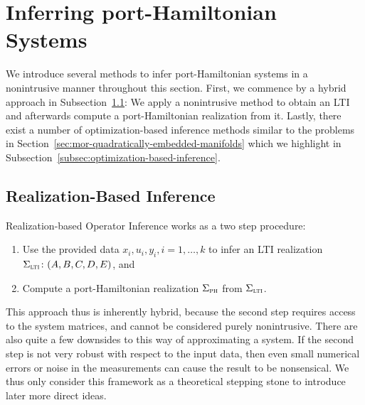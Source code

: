 \section{Inferring port-Hamiltonian Systems}\label{sec:inferring-ph-systems}

We introduce several methods to infer port-Hamiltonian systems in a nonintrusive manner throughout this section.
First, we commence by a hybrid approach in Subsection~\ref{subsec:realization-based-inference}: We apply a nonintrusive method to obtain an \ac{LTI} and afterwards compute a port-Hamiltonian realization from it.
Lastly, there exist a number of optimization-based inference methods similar to the problems in Section~\ref{sec:mor-quadratically-embedded-manifolds} which we highlight in Subsection~\ref{subsec:optimization-based-inference}.

\subsection{Realization-Based Inference}\label{subsec:realization-based-inference}

Realization-based Operator Inference works as a two step procedure:
\begin{enumerate}
    \item Use the provided data $x_i, u_i, y_i, i = 1, \dots, k$ to infer an \ac{LTI} realization $\Sigma_{\textnormal{\scshape lti}} \colon (A, B, C, D, E)$, and
    \item Compute a port-Hamiltonian realization $\Sigma_{\textnormal{\scshape ph}}$ from $\Sigma_{\textnormal{\scshape lti}}$.
\end{enumerate}
This approach thus is inherently hybrid, because the second step requires access to the system matrices, and cannot be considered purely nonintrusive.
There are also quite a few downsides to this way of approximating a system.
If the second step is not very robust with respect to the input data, then even small numerical errors or noise in the measurements can cause the result to be nonsensical.
We thus only consider this framework as a theoretical stepping stone to introduce later more direct ideas.




